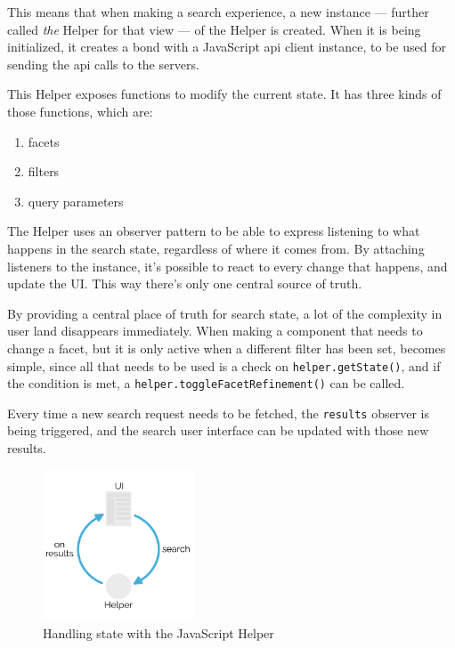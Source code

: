 This means that when making a search experience, a new instance --- further called \emph{the} Helper for that view --- of the Helper is created. When it is being initialized, it creates a bond with a JavaScript \acrshort{api} client instance, to be used for sending the \acrshort{api} calls to the servers.

This Helper exposes functions to modify the current state. It has three kinds of those functions, which are:

\begin{enumerate}
  \item facets
  \item filters
  \item query parameters
\end{enumerate}

The Helper uses an observer pattern to be able to express listening to what happens in the search state, regardless of where it comes from. By attaching listeners to the instance, it's possible to react to every change that happens, and update the UI. This way there's only one central source of truth.

By providing a central place of truth for search state, a lot of the complexity in user land disappears immediately. When making a component that needs to change a facet, but it is only active when a different filter has been set, becomes simple, since all that needs to be used is a check on {\tt helper.getState()}, and if the condition is met, a {\tt helper.toggleFacetRefinement()} can be called.

Every time a new search request needs to be fetched, the {\tt results} observer is being triggered, and the search user interface can be updated with those new results.

\begin{figure}[H]
  \centering
  \includegraphics[width=0.4\textwidth]{../assets/helper-cycle.pdf}
  \caption{Handling state with the JavaScript Helper\cite{js-helper-concepts}}
  \label{figure:js-helper-state}
\end{figure}


